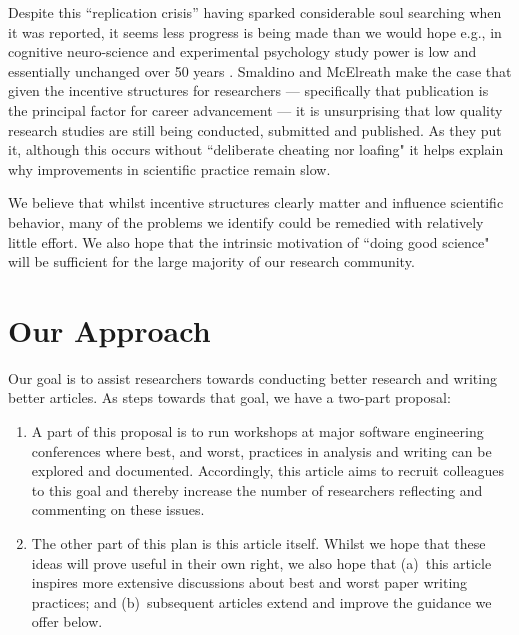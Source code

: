 \documentclass[preprint,10pt]{elsarticle}
\begin{document}
Despite this ``replication crisis'' having sparked considerable soul searching when it was reported, it seems less progress is being made than we would hope e.g., in cognitive neuro-science and experimental psychology study power is low and essentially unchanged over 50 years \cite{Szuc17}.  Smaldino and McElreath \cite{Smal16} make the case that given the incentive structures for researchers --- specifically that publication is the principal factor for career advancement --- it is unsurprising that low quality research studies are still being conducted, submitted and published.  As they put it, although this occurs without ``deliberate cheating nor loafing" it helps explain why improvements in scientific practice remain slow.  

We believe that whilst incentive structures clearly matter and influence scientific behavior, many of the problems we identify could be remedied with relatively little effort.  We also hope that the intrinsic motivation of ``doing good science" will be sufficient for the large majority of our research community.

\section{Our Approach}\label{Sec:Approach}


Our goal is to assist researchers towards conducting better research and writing better articles.  As steps towards that goal, we have a two-part proposal:
 
\begin{enumerate}
    \item A part of this proposal is to run workshops at major software engineering conferences where best, and worst, practices in analysis and writing can be explored and documented.
Accordingly, this article aims to recruit colleagues to this goal and thereby increase the number of  researchers reflecting and commenting on these issues.
\item The other part of this plan is this article itself.  Whilst we hope that these ideas will prove useful in their own right, we also hope that (a)~this article inspires more extensive discussions about best and worst paper writing practices; and (b)~subsequent articles extend and improve the guidance we offer below.
\end{enumerate}
\end{document}
